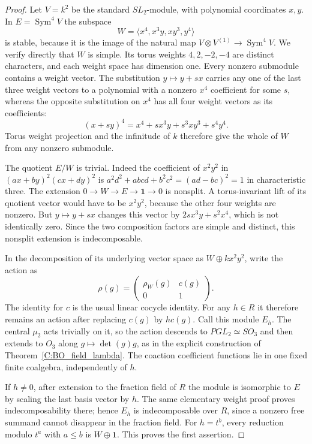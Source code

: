 \begin{proof}
Let $V=k^2$ be the standard $SL_2$-module, with polynomial
coordinates $x,y$.  In $E=\operatorname{Sym}^4V$ the subspace
\[
       W=\langle x^4,x^3y,xy^3,y^4\rangle
\]
is stable, because it is the image of the natural map
$V\otimes V^{(1)}\to\operatorname{Sym}^4V$.
We verify directly that $W$ is simple.  Its torus weights
$4,2,-2,-4$ are distinct characters, and each weight space
has dimension one.  Every nonzero submodule contains a
weight vector.  The substitution $y\mapsto y+s x$ carries
any one of the last three weight vectors to a polynomial
with a nonzero $x^4$ coefficient for some $s$, whereas
the opposite substitution on $x^4$ has all four weight
vectors as its coefficients:
\[
       (x+s y)^4=x^4+s x^3y+s^3xy^3+s^4y^4.
\]
Torus weight projection and the infinitude of $k$ therefore
give the whole of $W$ from any nonzero submodule.

The quotient $E/W$ is trivial.  Indeed the coefficient
of $x^2y^2$ in $(a x+b y)^2(c x+d y)^2$ is
$a^2d^2+abcd+b^2c^2=(ad-bc)^2=1$ in characteristic three.
The extension
$0\to W\to E\to\mathbf1\to0$ is nonsplit.
A torus-invariant lift of its quotient vector would have
to be $x^2y^2$, because the other four weights are nonzero.
But $y\mapsto y+s x$ changes this vector by
$2s x^3y+s^2x^4$, which is not identically zero.
Since the two composition factors are simple and distinct,
this nonsplit extension is indecomposable.

In the decomposition of its underlying vector space as
$W\oplus kx^2y^2$, write the action as
\[
          \rho(g)=\begin{pmatrix}\rho_W(g)&c(g)\\0&1\end{pmatrix}.
\]
The identity for $c$ is the usual linear cocycle identity.
For any $h\in R$ it therefore remains an action after
replacing $c(g)$ by $h c(g)$.  Call this module $E_h$.
The central $\mu_2$ acts trivially on it, so the action
descends to $PGL_2\simeq SO_3$ and then extends to $O_3$
along $g\mapsto\det(g)g$, as in the explicit construction
of Theorem~\ref{C:BO_field_lambda}.
The coaction coefficient functions lie in one fixed finite
coalgebra, independently of $h$.

If $h\ne0$, after extension to the fraction field of $R$
the module is isomorphic to $E$ by scaling the last basis
vector by $h$.  The same elementary weight proof proves
indecomposability there; hence $E_h$ is indecomposable
over $R$, since a nonzero free summand cannot disappear
in the fraction field.  For $h=t^b$, every reduction
modulo $t^a$ with $a\leq b$ is $W\oplus\mathbf1$.
This proves the first assertion.


\end{proof}
